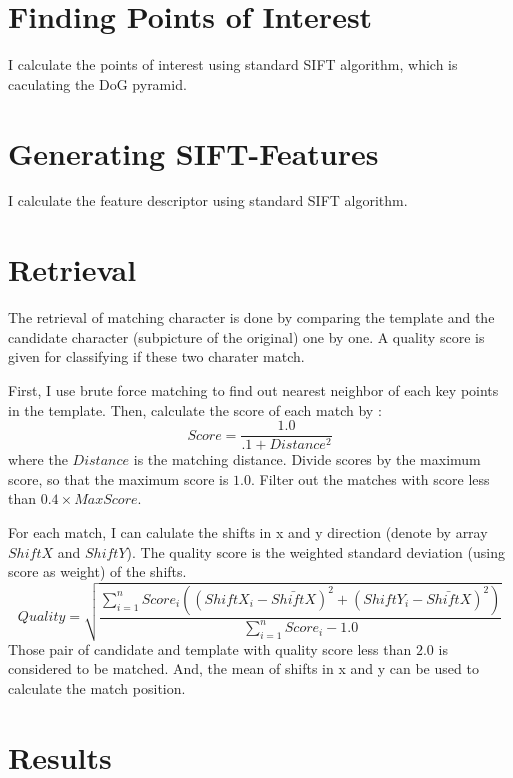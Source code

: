 \documentclass[a4paper,11pt]{article}
\begin{document}
\clearpage
\section{Finding Points of Interest}
I calculate the points of interest using standard SIFT algorithm, which is caculating the DoG pyramid.

\section{Generating SIFT-Features}
I calculate the feature descriptor using standard SIFT algorithm. 

\section{Retrieval}
The retrieval of matching character is done by comparing the template and the candidate character (subpicture of the original) one by one. A quality score is given for classifying if these two charater match.

First, I use brute force matching to find out nearest neighbor of each key points in the template. Then, calculate the score of each match by :
\[
  Score = \frac{1.0}{.1 + Distance^2}
\]
where the $Distance$ is the matching distance. Divide scores by the maximum score, so that the maximum score is $1.0$. Filter out the matches with score less than $0.4 \times MaxScore$.

For each match, I can calulate the shifts in x and y direction (denote by array $ShiftX$ and $ShiftY$). The quality score is the weighted standard deviation (using score as weight) of the shifts.
\[
  Quality = \sqrt{\frac{\sum_{i=1}^{n} Score_i ((ShiftX_i-\bar{ShiftX})^2 + (ShiftY_i-\bar{ShiftX})^2)} {\sum_{i=1}^{n} Score_i - 1.0}}
\]
Those pair of candidate and template with quality score less than $2.0$ is considered to be matched. And, the mean of shifts in x and y can be used to calculate the match position.

\clearpage
\section{Results}
\end{document}
